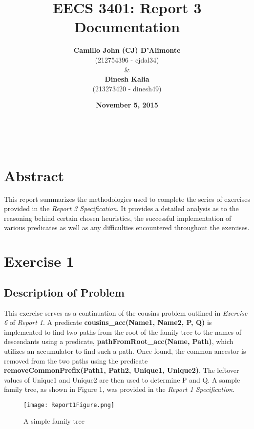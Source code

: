 \documentclass[11pt]{article}
\newcommand{\forceindent}{\leavevmode{\parindent=1em\indent}}
\begin{document}
\title{\textbf{EECS 3401: Report 3 Documentation}}
\author{\textbf{Camillo John (CJ) D'Alimonte}\\ (212754396 - cjdal34) \\
\& \\
\textbf{Dinesh Kalia}\\ (213273420 - dinesh49)}
\date {\textbf{November 5, 2015}}
\maketitle

\tableofcontents

\



\section{Abstract}
\forceindent This report summarizes the methodologies used to complete the series of exercises provided in the \emph{Report 3 Specification}. It provides a detailed analysis as to the reasoning behind certain chosen heuristics, the successful implementation of various predicates as well as any difficulties encountered throughout the exercises.    
\section{Exercise 1}
	\subsection{Description of Problem}
\forceindent This exercise serves as a continuation of the cousins problem outlined in \emph{Exercise 6} of \emph{Report 1}. A predicate \textbf{cousins\_acc(Name1, Name2, P, Q)} is implemented to find two paths from the root of the family tree to the names of descendants using a predicate, \textbf{pathFromRoot\_acc(Name, Path)}, which utilizes an accumulator to find such a path. Once found, the common ancestor is removed from the two paths using the predicate \textbf{removeCommonPrefix(Path1, Path2, Unique1, Unique2)}. The leftover values of Unique1 and Unique2 are then used to determine P and Q. A sample family tree, as shown in Figure 1, was provided in the \emph{Report 1 Specification}. 

\begin{figure}[h!]
  \centering
{\texttt{[image: Report1Figure.png]}}
  \caption{A simple family tree}
  \end{figure}
\end{document}
